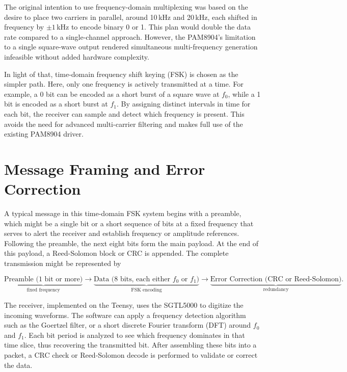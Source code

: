 The original intention to use frequency-domain multiplexing was based on the desire to place two carriers in parallel, around 10\,kHz and 20\,kHz, each shifted in frequency by \(\pm1\)\,kHz to encode binary 0 or 1. This plan would double the data rate compared to a single-channel approach. However, the PAM8904's limitation to a single square-wave output rendered simultaneous multi-frequency generation infeasible without added hardware complexity. 

In light of that, time-domain frequency shift keying (FSK) is chosen as the simpler path. Here, only one frequency is actively transmitted at a time. For example, a 0 bit can be encoded as a short burst of a square wave at \(f_0\), while a 1 bit is encoded as a short burst at \(f_1\). By assigning distinct intervals in time for each bit, the receiver can sample and detect which frequency is present. This avoids the need for advanced multi-carrier filtering and makes full use of the existing PAM8904 driver.

\section{Message Framing and Error Correction}

A typical message in this time-domain FSK system begins with a preamble, which might be a single bit or a short sequence of bits at a fixed frequency that serves to alert the receiver and establish frequency or amplitude references. Following the preamble, the next eight bits form the main payload. At the end of this payload, a Reed-Solomon block or CRC is appended. The complete transmission might be represented by

\[
\underbrace{\text{Preamble (1 bit or more)}}_{\text{fixed frequency}} 
\longrightarrow 
\underbrace{\text{Data (8 bits, each either } f_0 \text{ or } f_1\text{)}}_{\text{FSK encoding}} 
\longrightarrow 
\underbrace{\text{Error Correction (CRC or Reed-Solomon)}}_{\text{redundancy}}.
\]

The receiver, implemented on the Teensy, uses the SGTL5000 to digitize the incoming waveforms. The software can apply a frequency detection algorithm such as the Goertzel filter, or a short discrete Fourier transform (DFT) around \(f_0\) and \(f_1\). Each bit period is analyzed to see which frequency dominates in that time slice, thus recovering the transmitted bit. After assembling these bits into a packet, a CRC check or Reed-Solomon decode is performed to validate or correct the data. 

